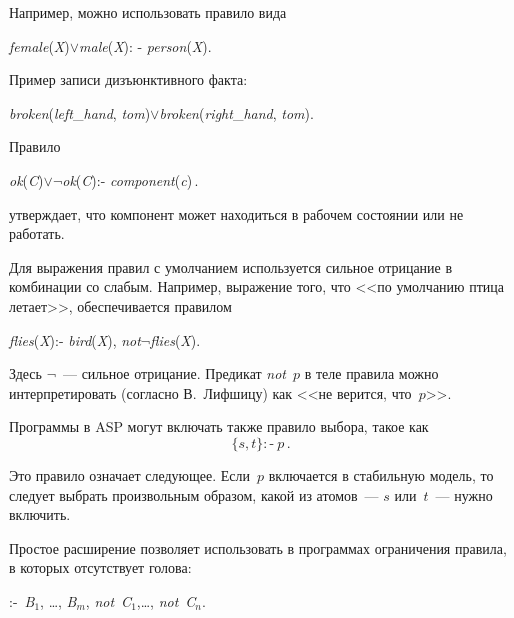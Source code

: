 \begin{multicols}{2}
\noindent
Например, можно использовать правило вида

\begin{center}
\textit{female}(\textit{X})\;$\vee$\;\textit{male}(\textit{X}): - \textit{person}(\textit{X}).
\end{center}

\noindent
Пример записи дизъюнктивного факта:

\begin{center}
\textit{broken}(\textit{left}\_\textit{hand}, 
\textit{tom})\;$\vee$\textit{broken}(\textit{right}\_\textit{hand}, \textit{tom}).
\end{center}

\noindent
Правило

\begin{center}
\textit{ok}(\textit{C})\;$\vee\lnot$\;\textit{ok}(\textit{C}):\;- \textit{component}(\textit{c})\,.
\end{center}

\noindent
утверждает, что компонент может находиться в рабочем состоянии или не работать.

Для выражения правил с умолчанием используется сильное отрицание в комбинации со 
слабым. Например, выражение того, что <<по умолчанию птица летает>>, обеспечивается 
правилом

\begin{center}
\textit{flies}(\textit{X}):\;-  \textit{bird}(\textit{X}), \textit{not}\;$\lnot$\;\textit{flies}(\textit{X}).
\end{center}

\noindent
Здесь $\lnot$~--- сильное отрицание. Предикат \textit{not}~$p$ в теле правила можно 
интерпретировать (согласно В.~Лифшицу) как <<не верится, что~$p$>>. 



Программы в ASP могут включать также правило выбора, такое как 
$$
\{s, t\}:\mbox{-}\ p\,.
$$

\pagebreak

\noindent
Это правило означает следующее. Если~$p$ включается в стабильную модель, то следует 
выбрать произвольным образом, какой из атомов~--- $s$ или~$t$~--- нужно включить. 



Простое расширение позволяет использовать в программах ограничения правила, в 
которых отсутствует голова:

\begin{center}
:\;-\  \textit{B}$_1$, \ldots , \textit{B}$_m$, \textit{not}\ \textit{C}$_1$,\ldots , 
\textit{not}\ \textit{C}$_n$.
\end{center}


\end{multicols}
